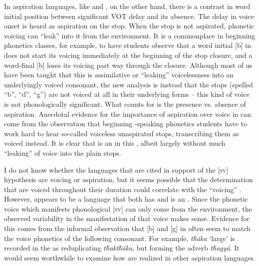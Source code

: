 \documentclass[output=paper]{LSP/langsci}
\begin{document}
In aspiration languages, like  and , on the other hand, there is a contrast in word initial position between significant VOT delay and its absence. The delay in voice onset is heard as aspiration on the stop. When the stop is not aspirated, phonetic voicing can ``leak'' into it from the environment. It is a commonplace in beginning phonetics classes, for example, to have students observe that a word initial [b] in  does not start its voicing immediately at the beginning of the stop closure, and a word-final [b] loses its voicing part way through the closure. Although most of us have been taught that this is assimilative or ``leaking'' voicelessness into an underlyingly voiced consonant, the new analysis is instead that the stops (spelled ``b'', ``d'', ``g'') are not voiced at all in their underlying forms -- this kind of voice is not phonologically significant. What counts for  is the presence vs. absence of aspiration. Anecdotal evidence for the importance of aspiration over voice in  can come from the observation that beginning -speaking phonetics students have to work hard to hear so-called voiceless unaspirated stops, transcribing them as voiced instead. It is clear that  is an  in this , albeit largely without much ``leaking'' of voice into the plain stops.

I do not know whether the languages that are cited in support of the [\textsc{sv}] hypothesis are voicing or aspiration, but it seems possible that the determination that  are voiced throughout their duration could correlate with the ``voicing'' . However,  appears to be a language that both has  and is an . Since the phonetic voice which manifests phonological [\textsc{sv}] can only come from the environment, the observed variability in the manifestation of that voice makes sense. Evidence for this comes from the informal observation that [b] and [g] in  often seem to match the voice phonetics of the following consonant. For example, \textit{t\v{h}\'aka} `large' is recorded in the  as reduplicating \textit{t\v{h}akt\v{h}\'aka}, but forming the adverb \textit{t\v{h}agy\'a}. It would seem worthwhile to examine how  are realized in other aspiration languages.
\end{document}
